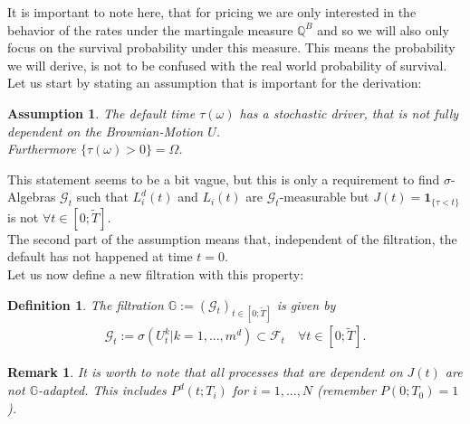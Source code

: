 \documentclass[12pt]{article}
\newtheorem{assumption}{Assumption}[section]
\newtheorem{remark}[theorem]{Remark}
\newtheorem{definition}[theorem]{Definition}
\begin{document}
	It is important to note here, that for pricing we are only interested in the behavior of the rates under the martingale measure $\mathbb{Q}^B$ and so we will also only focus on the survival probability under this measure. This means the probability we will derive, is not to be confused with the real world probability of survival.\\
	
	Let us start by stating an assumption that is important for the derivation:
	\begin{assumption}
		The default time $\tau(\omega)$ has a stochastic driver, that is not fully dependent on the Brownian-Motion $U$. \\
		Furthermore $\{\tau(\omega) > 0\} = \Omega$.
	\end{assumption}
	This statement seems to be a bit vague, but this is only a requirement to find $\sigma$-Algebras $\mathcal{G}_t$ such that $L^d_i(t)$ and $L_i(t)$ are $\mathcal{G}_t$-measurable but $J(t) = \mathbf{1}_{\{\tau < t\}}$ is not $\forall t \in [0;\tilde{T}]$.\\
	The second part of the assumption means that, independent of the filtration, the default has not happened at time $t=0$.\\
	Let us now define a new filtration with this property:
	\begin{definition}
		The filtration $\mathbb{G} := (\mathcal{G}_t)_{t\in\left[0;\tilde{T}\right]}$ is given by
		\begin{align*}
			\mathcal{G}_t := \sigma(U^k_t | k = 1, ..., m^d) \subset \mathcal{F}_t \quad \forall t \in  [0;\tilde{T}].
		\end{align*}
	\end{definition}
	\begin{remark}
		It is worth to note that all processes that are dependent on $J(t)$ are not $\mathbb{G}$-adapted. This includes $P^d(t;T_i)$ for $i=1, ...,N$ (remember $P(0;T_0) = 1$).
	\end{remark}
	
\end{document}
